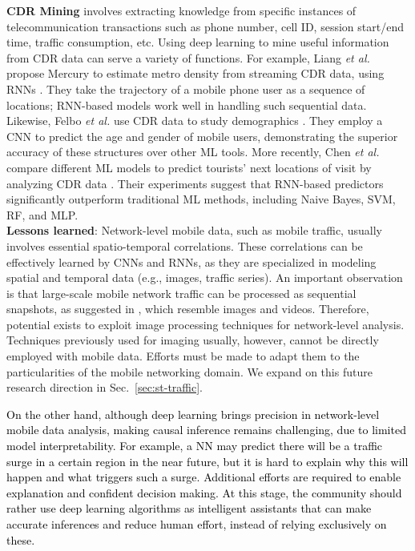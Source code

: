 \documentclass[journal,comsoc,letter]{IEEEtran}
\newcommand{\rev}[1]{\textcolor{black}{#1}}
\begin{document}
\noindent\textbf{CDR Mining} involves extracting knowledge from specific instances of telecommunication transactions such as phone number, cell ID, session start/end time, traffic consumption, etc. Using deep learning to mine useful information from CDR data can serve a variety of functions. For example, Liang \emph{et al.} propose Mercury to estimate metro density from streaming CDR data, using RNNs \cite{liang2016mercury}. They take the trajectory of a mobile phone user as a sequence of locations; RNN-based models work well in handling such sequential data. Likewise, Felbo \emph{et al.} use CDR data to study demographics \cite{felbo2016using}. They employ a CNN to predict the age and gender of mobile users, demonstrating the superior accuracy of these structures over other ML tools. More recently, Chen \emph{et al.} compare different ML models to predict tourists' next locations of visit by analyzing CDR data \cite{chen2017comprehensive}. Their experiments suggest that RNN-based predictors significantly outperform traditional ML methods, including Naive Bayes, SVM, RF, and MLP.\\

\textbf{Lessons learned}: Network-level mobile data, such as mobile traffic, usually involves essential spatio-temporal correlations. These correlations can be effectively learned by CNNs and RNNs, as they are specialized in modeling spatial and temporal data (e.g., images, traffic series). An important observation is that large-scale mobile network traffic can be processed as sequential snapshots, as suggested in \cite{chaoyun2017zipnet, zhang2017long}, which resemble images and videos. Therefore, potential exists to exploit image processing techniques for network-level analysis. Techniques previously used for imaging usually, however, cannot be directly employed with mobile data. Efforts must be made to adapt them to the particularities of the mobile networking domain. We expand on this future research direction in Sec.~\ref{sec:st-traffic}. 

\rev{On the other hand, although deep learning brings precision in network-level mobile data analysis, making causal inference remains challenging, due to limited model interpretability. For example, a NN may predict there will be a traffic surge in a certain region in the near future, but it is hard to explain why this will happen and what triggers such a surge. Additional efforts are required to enable explanation and confident decision making. At this stage, the community should rather use deep learning algorithms as intelligent assistants that can make accurate inferences and reduce human effort, instead of relying exclusively on these. }
\end{document}
